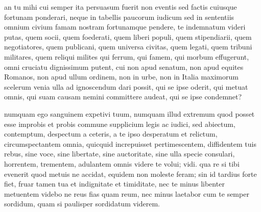  an tu mihi cui semper ita persuasum fuerit non eventis sed factis cuiusque fortunam ponderari, neque in tabellis paucorum iudicum sed in sententiis omnium civium famam nostram fortunamque pendere, te indemnatum videri putas, quem socii, quem foederati, quem liberi populi, quem stipendiarii, quem negotiatores, quem publicani, quem universa civitas, quem legati, quem tribuni militares, quem reliqui milites qui ferrum, qui famem, qui morbum effugerunt, omni cruciatu dignissimum putent, cui non apud senatum, non apud equites Romanos, non apud ullum ordinem, non in urbe, non in Italia maximorum scelerum venia ulla ad ignoscendum dari possit, qui se ipse oderit, qui metuat omnis, qui suam causam nemini committere audeat, qui se ipse condemnet?

 numquam ego sanguinem expetivi tuum, numquam illud extremum quod posset esse improbis et probis commune supplicium legis ac iudici, sed abiectum, contemptum, despectum a ceteris, a te ipso desperatum et relictum, circumspectantem omnia, quicquid increpuisset pertimescentem, diffidentem tuis rebus, sine voce, sine libertate, sine auctoritate, sine ulla specie consulari, horrentem, trementem, adulantem omnis videre te volui; vidi. qua re si tibi evenerit quod metuis ne accidat, equidem non moleste feram; sin id tardius forte fiet, fruar tamen tua et indignitate et timiditate, nec te minus libenter metuentem videbo ne reus fias quam reum, nec minus laetabor cum te semper sordidum, quam si paulisper sordidatum viderem.
